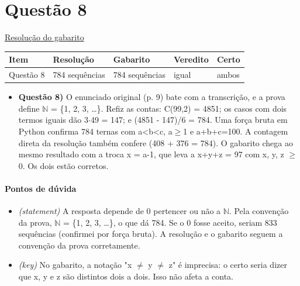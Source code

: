 \documentclass{article}%
\begin{document}
\section*{Questão 8}%
\href{https://poliedroresolve.sistemapoliedro.com.br/vestibulares/ita/2026/ita-2-fase-dia-1-28-10-2025-2-fase-dia-1/dissertativa-8-matematica-2-fase-dia-1-ita-2026}{Resolução do gabarito}\par\smallskip%
\begin{longtable}{@{}p{} p{} p{} p{} p{}@{}}\toprule Item & Resolução & Gabarito & Veredito & Certo \\ \midrule
Questão 8 & 784 sequências & 784 sequências & igual & ambos \\
\bottomrule\end{longtable}%
\begin{itemize}%
\item%
\textbf{Questão 8)} O enunciado original (p. 9) bate com a transcrição, e a prova define $\mathbb{N}$ = \{1, 2, 3, \ldots{}\}. Refiz as contas: C(99,2) = 4851; os casos com dois termos iguais dão 3$\cdot$49 = 147; e (4851 - 147)/6 = 784. Uma força bruta em Python confirma 784 ternas com a<b<c, a$\geq$1 e a+b+c=100. A contagem direta da resolução também confere (408 + 376 = 784). O gabarito chega ao mesmo resultado com a troca x = a-1, que leva a x+y+z = 97 com x, y, z $\geq$ 0. Os dois estão corretos.%
\end{itemize}%
\paragraph{Pontos de dúvida}%
\begin{itemize}%
\item%
\textit{(statement)} A resposta depende de 0 pertencer ou não a $\mathbb{N}$. Pela convenção da prova, $\mathbb{N}$ = \{1, 2, 3, \ldots{}\}, o que dá 784. Se o 0 fosse aceito, seriam 833 sequências (confirmei por força bruta). A resolução e o gabarito seguem a convenção da prova corretamente.%
\item%
\textit{(key)} No gabarito, a notação "x $\neq$ y $\neq$ z" é imprecisa: o certo seria dizer que x, y e z são distintos dois a dois. Isso não afeta a conta.%
\end{itemize}%
\end{document}
